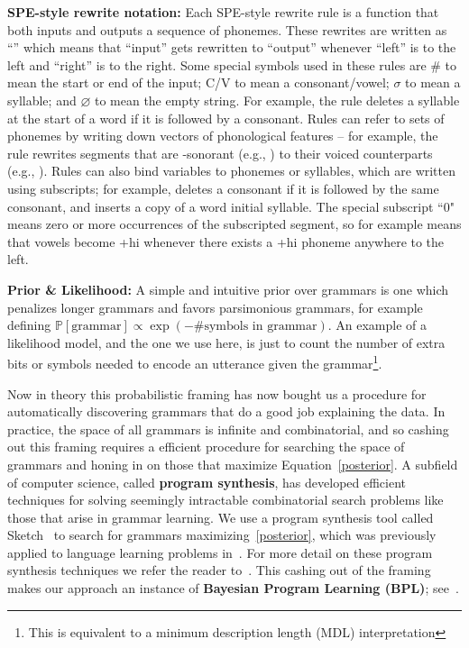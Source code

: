 \documentclass{article}
\newcommand{\probability}{\mathds{P}} %
\begin{document}
\noindent\textbf{SPE-style rewrite notation:} Each SPE-style rewrite rule is a function that both inputs and outputs a sequence of phonemes.
These rewrites are written as ``'' %
which means that ``input'' gets rewritten to ``output'' whenever ``left'' is to the left and ``right'' is to the right.
Some special symbols used in these rules are \# to mean the start or end of the input;
C/V to mean a consonant/vowel; $\sigma $ to mean a syllable;
and $\varnothing$ to mean the empty string.
For example, the rule
deletes a syllable at the start of a word if it is followed by a consonant.
Rules can refer to sets of phonemes by writing down vectors of phonological features -- for example,
the rule \phon{[-son]}{[+voice]} rewrites segments that are -sonorant (e.g., ) to their voiced counterparts (e.g., ).
Rules can also bind variables to phonemes or syllables,
which are written using subscripts;
for example,
deletes a consonant if it is followed by the same consonant,
and
inserts a copy of a word initial syllable.
The special subscript ``0" means zero or more occurrences of the subscripted segment,
so for example  means that vowels become +hi whenever there exists a +hi phoneme anywhere to the left.

\noindent \textbf{Prior \& Likelihood:} A simple and intuitive prior over grammars is one which penalizes longer grammars and favors parsimonious grammars, for example defining $\probability\left[\text{grammar} \right]\propto\exp\left(- \text{\# symbols in grammar} \right)$. An example of a likelihood model,
and the one we use here,
is just to count the number of extra bits or symbols needed to encode an utterance given the grammar\footnote{This is equivalent to a minimum description length (MDL) interpretation}.

Now in theory this probabilistic framing
has now bought us a procedure for automatically discovering
grammars that do a good job explaining the data.
In practice,
the space of all grammars is infinite and combinatorial,
and so cashing out this framing requires a
efficient procedure for searching the space of grammars and honing in on those that maximize Equation~\ref{posterior}.
A subfield of computer science, called \textbf{program synthesis},
has developed efficient techniques for
solving seemingly intractable combinatorial search problems
like those that arise in grammar learning.
We use a program synthesis tool called Sketch~\cite{solar2008program}
to search for grammars maximizing~\ref{posterior},
which was previously applied to language learning problems in~\cite{ellis2015unsupervised}.
For more detail on these program synthesis techniques we refer the reader to~\cite{solar2008program}.
This cashing out of the framing makes
our approach an instance of  \textbf{Bayesian Program Learning (BPL)}; see~\cite{lake2015human}.
\end{document}
